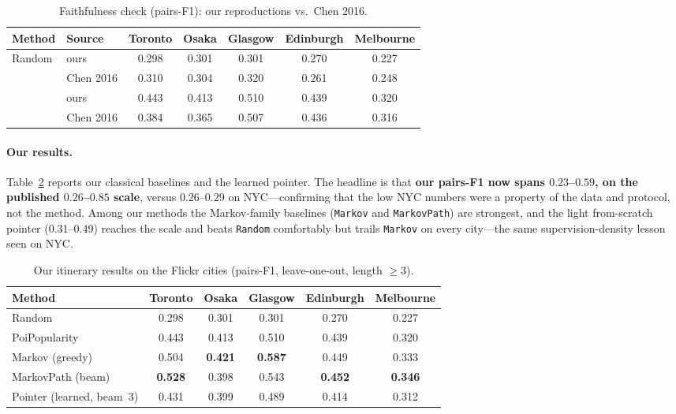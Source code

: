 \begin{table}[ht]
\centering
\caption{Faithfulness check (pairs-F1): our reproductions vs.\ Chen 2016.}
\label{tab:flickr-faith}
\begin{tabular}{llccccc}
\toprule
Method & Source & Toronto & Osaka & Glasgow & Edinburgh & Melbourne \\
\midrule
\multirow{2}{*}{Random} & ours & 0.298 & 0.301 & 0.301 & 0.270 & 0.227 \\
                        & Chen 2016 & 0.310 & 0.304 & 0.320 & 0.261 & 0.248 \\
\addlinespace
\multirow{2}{*}{PoiPopularity} & ours & 0.443 & 0.413 & 0.510 & 0.439 & 0.320 \\
                               & Chen 2016 & 0.384 & 0.365 & 0.507 & 0.436 & 0.316 \\
\bottomrule
\end{tabular}
\end{table}



\paragraph{Our results.} Table~\ref{tab:flickr-ours} reports our classical baselines and the
learned pointer. The headline is that \textbf{our pairs-F1 now spans $0.23$--$0.59$, on the
published $0.26$--$0.85$ scale}, versus $0.26$--$0.29$ on NYC---confirming that the low NYC
numbers were a property of the data and protocol, not the method. Among our methods the
Markov-family baselines (\texttt{Markov} and \texttt{MarkovPath}) are strongest, and the light
from-scratch pointer (0.31--0.49) reaches the scale and beats \texttt{Random} comfortably but
trails \texttt{Markov} on every city---the same supervision-density lesson seen on NYC.

\begin{table}[ht]
\centering
\caption{Our itinerary results on the Flickr cities (pairs-F1, leave-one-out, length $\ge 3$).}
\label{tab:flickr-ours}
\begin{tabular}{lccccc}
\toprule
Method & Toronto & Osaka & Glasgow & Edinburgh & Melbourne \\
\midrule
Random        & 0.298 & 0.301 & 0.301 & 0.270 & 0.227 \\
PoiPopularity & 0.443 & 0.413 & 0.510 & 0.439 & 0.320 \\
Markov (greedy) & 0.504 & \textbf{0.421} & \textbf{0.587} & 0.449 & 0.333 \\
MarkovPath (beam) & \textbf{0.528} & 0.398 & 0.543 & \textbf{0.452} & \textbf{0.346} \\
Pointer (learned, beam~3) & 0.431 & 0.399 & 0.489 & 0.414 & 0.312 \\
\bottomrule
\end{tabular}
\end{table}

